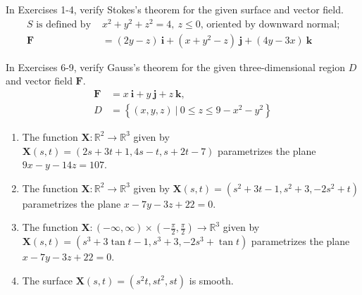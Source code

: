 \documentclass[12pt,letterpaper]{hmcpset}
\newcommand{\f}[2]{\frac{#1}{#2}}
\newcommand{\bb}[1]{\mathbb{#1}}
\newcommand{\set}[1]{\left\{#1\right\}}
\renewcommand{\bf}[1]{\mathbf{#1}}
\begin{document}
\begin{problem}[Colley 7.3.4]
    In Exercises 1-4, verify Stokes's theorem for the given surface
    and vector field.
    \begin{align*}
        S\text{ is defined by }&x^2+y^2+z^2=4,~z\leq0\text{, oriented
        by downward normal;}\\
        \bf{F}&=(2y-z)~\bf{i}+(x+y^2-z)~\bf{j}+(4y-3x)~\bf{k}
    \end{align*}
\end{problem}
\begin{solution}
    \vfill
\end{solution}
\newpage

\begin{problem}[Colley 7.3.6]
    In Exercises 6-9, verify Gauss's theorem for the given
    three-dimensional region $D$ and vector field $\bf{F}$.
    \begin{align*}
        \bf{F}&=x~\bf{i}+y~\bf{j}+z~\bf{k},\\
        D&=\set{(x,y,z)~|~0\leq z\leq9-x^2-y^2}
    \end{align*}
\end{problem}
\begin{solution}
    \vfill
\end{solution}
\newpage

\begin{problem}
    \begin{enumerate}[label=\textbf{\arabic*.}]
        \item The function $\bf{X}:\bb{R}^2\to\bb{R}^3$ given by
            $\bf{X}(s,t)=(2s+3t+1,4s-t,s+2t-7)$ parametrizes the plane
            $9x-y-14z=107$.
        \item The function $\bf{X}:\bb{R}^2\to\bb{R}^3$ given by
            $\bf{X}(s,t)=(s^2+3t-1,s^2+3,-2s^2+t)$ parametrizes the
            plane $x-7y-3z+22=0$.
        \item The function
            $\bf{X}:(-\infty,\infty)\times(-\f{\pi}{2},\f{\pi}{2})\to\bb{R}^3$
            given by $\bf{X}(s,t)=(s^3+3\tan t-1,s^3+3,-2s^3+\tan t)$
            parametrizes the plane $x-7y-3z+22=0$.
        \item The surface $\bf{X}(s,t)=(s^2t,st^2,st)$ is smooth.
    \end{enumerate}
\end{problem}
\begin{solution}
    \vfill
\end{solution}
\newpage
\end{document}
